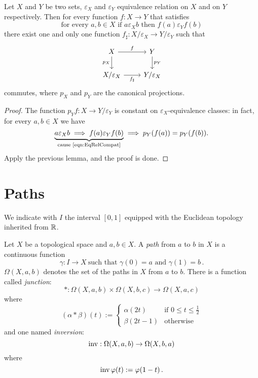 \begin{proposition}\label{prop:FunctionCompatibleWithEqRels}
Let \(X\) and \(Y\) be two sets, \(\varepsilon_X\) and \(\varepsilon_Y\) equivalence relation on \(X\) and on \(Y\) respectively. Then for every function \(f : X \to Y\) that satisfies
\begin{equation}
\text{for every } a, b \in X \text{ if } a \varepsilon_X b \text{ then } f(a) \varepsilon_Y f(b) \label{eqn:EqRelCompat}
\end{equation}
there exist one and only one function \(f_\sharp : X/\varepsilon_X \to Y/\varepsilon_Y\) such that
\[\begin{tikzcd}
X \ar["{p_X}", swap, d] \ar["f", r] & Y \ar["p_Y", d] \\
X/\varepsilon_X \ar["{f_\sharp}", swap, r] & Y/\varepsilon_X
\end{tikzcd}\]
commutes, where \(p_X\) and \(p_Y\) are the canonical projections.
\end{proposition}

\begin{proof}
The function \(p_Yf : X \to Y/\varepsilon_Y\) is constant on \(\varepsilon_X\)-equivalence classes: in fact, for every \(a, b \in X\) we have
\[\underbrace{a \varepsilon_X b \implies f(a) \varepsilon_Y f(b)}_{\text{cause~\eqref{eqn:EqRelCompat}}} \implies p_Y(f(a)) = p_Y(f(b)).\]
Apply the previous lemma, and the proof is done.
\end{proof}

\section{Paths}

We indicate with \(I\) the interval \([0, 1]\) equipped with the Euclidean topology inherited from \(\mathbb R\).

\begin{definition}
Let \(X\) be a topological space and \(a, b \in X\). A {\em path} from \(a\) to \(b\) in \(X\) is a continuous function
\[\gamma : I \to X \ \text{such that } \gamma(0)=a \text{ and } \gamma(1)=b\,.\]
\(\Omega(X, a, b)\) denotes the set of the paths in \(X\) from \(a\) to \(b\). There is a function called {\em junction}:
\[\ast : \Omega(X, a, b) \times \Omega(X, b, c) \to \Omega(X, a, c)\]
where
\[(\alpha \ast \beta)(t) := \begin{cases} \alpha(2t) & \text{if } 0 \le t \le \frac12 \\ \beta(2t-1) & \text{otherwise} \end{cases}\]
and one named {\em inversion}:
\[\operatorname{inv} : \Omega(X, a, b) \to \Omega(X, b, a)\]
where
\[\operatorname{inv} \varphi(t) := \varphi(1-t)\,.\]
\end{definition}

